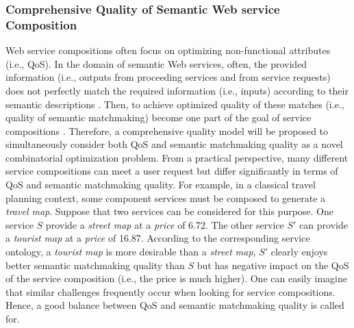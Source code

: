 \subsubsection{Comprehensive Quality of Semantic Web service Composition}\label{SC:hybridisation}
Web service compositions often focus on optimizing non-functional attributes (i.e., QoS). In the domain of semantic Web services, often, the provided information (i.e., outputs from proceeding services and from service requests) does not perfectly match the required information (i.e., inputs) according to their semantic descriptions \cite{lecue2008optimizing}. Then, to achieve optimized quality of these matches (i.e., quality of semantic matchmaking) become one part of the goal of service compositions \cite{lecue2009optimizing}. Therefore, a comprehensive quality model will be proposed to simultaneously consider both QoS and semantic matchmaking quality as a novel combinatorial optimization problem. From a practical perspective, many different service compositions can meet a user request but differ significantly in terms of QoS and semantic matchmaking quality. For example, in a classical travel planning context, some component services must be composed to generate a \emph{travel map}. Suppose that two services can be considered for this purpose. One service $S$ provide a \emph{street map} at a \emph{price} of 6.72. The other service $S'$ can provide a \emph{tourist map} at a \emph{price} of 16.87. According to the corresponding service ontology, a \emph{tourist map} is more desirable than a \emph{street map}, $S'$ clearly enjoys better semantic matchmaking quality than $S$ but has negative impact on the QoS of the service composition (i.e., the price is much higher). One can easily imagine that similar challenges frequently occur when looking for service compositions. Hence, a good balance between QoS and semantic matchmaking quality is called for.

